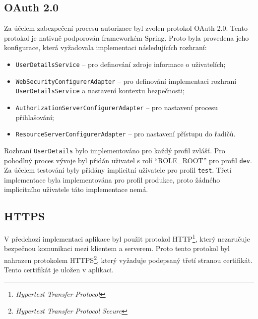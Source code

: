     \subsection{OAuth 2.0}
        Za účelem zabezpečení procesu autorizace byl zvolen protokol OAuth 2.0. Tento protokol je nativně podporován frameworkém Spring. Proto byla provedena jeho konfigurace, která vyžadovala implementaci následujících rozhraní:
        \begin{itemize}
            \item \texttt{UserDetailsService} -- pro definování zdroje informace o uživatelích;
            \item \texttt{WebSecurityConfigurerAdapter} -- pro definování implementaci rozhraní \texttt{UserDetailsService} a nastavení kontextu bezpečnosti;
            \item \texttt{AuthorizationServerConfigurerAdapter} -- pro nastavení procesu přihlašování;
            \item \texttt{ResourceServerConfigurerAdapter} -- pro nastavení přístupu do řadičů.
        \end{itemize}
        
        Rozhraní \verb|UserDetails| bylo implementováno pro každý profil zvlášť. Pro pohodlný proces vývoje byl přidán uživatel s rolí \enquote{ROLE\_ROOT} pro profil \verb|dev|. Za účelem testování byly přidány implicitní uživatele pro profil \verb|test|. Třetí implementace byla implementována pro profil produkce, proto žádného implicitního uživatele táto implementace nemá.
        
    \subsection{HTTPS}
        V předchozí implementaci aplikace byl použit protokol HTTP\footnote{\textit{Hypertext Transfer Protocol}}, který nezaručuje bezpečnou komunikaci mezi klientem a serverem. Proto tento protokol byl nahrazen protokolem HTTPS\footnote{\textit{Hypertext Transfer Protocol Secure}}, který vyžaduje podepsaný třetí stranou certifikát. Tento certifikát je uložen v aplikaci.
        
